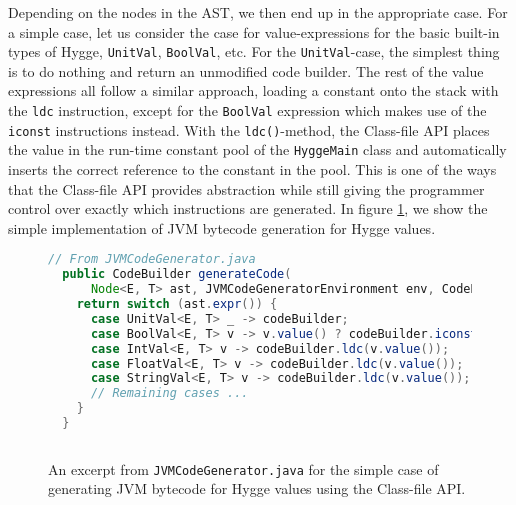 Depending on the nodes in the AST, we then end up in the appropriate case. For a simple case, let us consider the case
for value-expressions for the basic built-in types of Hygge, \texttt{UnitVal}, \texttt{BoolVal}, etc. For the \texttt{UnitVal}-case,
the simplest thing is to do nothing and return an unmodified code builder. The rest of the value expressions all follow a similar approach,
loading a constant onto the stack with the \texttt{ldc}\cite{jvm_spec} instruction, except for the \texttt{BoolVal} expression which makes use of the
\texttt{iconst} instructions instead. With the \texttt{ldc()}-method, the Class-file API places the value in the run-time constant pool
of the \texttt{HyggeMain} class and automatically inserts the correct reference to the constant in the pool. This is one of the ways
that the Class-file API provides abstraction while still giving the programmer control over exactly which instructions are generated.
In figure \ref{fig:jvm_value_codegen}, we show the simple implementation of JVM bytecode generation for Hygge values.

\begin{figure}[H]
\centering
\begin{lstlisting}[language=Java]
  // From JVMCodeGenerator.java
  public CodeBuilder generateCode(
      Node<E, T> ast, JVMCodeGeneratorEnvironment env, CodeBuilder codeBuilder) {
    return switch (ast.expr()) {
      case UnitVal<E, T> _ -> codeBuilder;
      case BoolVal<E, T> v -> v.value() ? codeBuilder.iconst_1() : codeBuilder.iconst_0();
      case IntVal<E, T> v -> codeBuilder.ldc(v.value());
      case FloatVal<E, T> v -> codeBuilder.ldc(v.value());
      case StringVal<E, T> v -> codeBuilder.ldc(v.value());
      // Remaining cases ... 
    }
  }
 
\end{lstlisting}
\caption{An excerpt from \texttt{JVMCodeGenerator.java} for the simple case of generating JVM bytecode for Hygge values using the Class-file API.}
\label{fig:jvm_value_codegen}
\end{figure}

